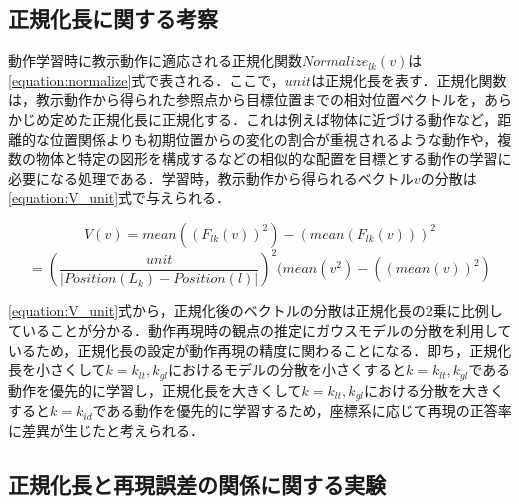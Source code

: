\subsection{正規化長に関する考察}
\label{subsection:UNIT}
動作学習時に教示動作に適応される正規化関数$Normalize_{lk}(v)$は\ref{equation:normalize}式で表される．ここで，$unit$は正規化長を表す．正規化関数は，教示動作から得られた参照点から目標位置までの相対位置ベクトルを，あらかじめ定めた正規化長に正規化する．これは例えば物体に近づける動作など，距離的な位置関係よりも初期位置からの変化の割合が重視されるような動作や，複数の物体と特定の図形を構成するなどの相似的な配置を目標とする動作の学習に必要になる処理である．学習時，教示動作から得られるベクトル$v$の分散は\ref{equation:V_unit}式で与えられる．

\[
	V(v) = mean((F_{lk}(v))^{2}) - (mean(F_{lk}(v)))^{2}
\]
\begin{equation}
	\label{equation:V_unit}
	 = \left(\frac{unit}{| Position(L_{k})-Position(l) |}\right)^{2}(mean(v^{2}) - ((mean(v))^{2})
\end{equation}

\ref{equation:V_unit}式から，正規化後のベクトルの分散は正規化長の2乗に比例していることが分かる．動作再現時の観点の推定にガウスモデルの分散を利用しているため，正規化長の設定が動作再現の精度に関わることになる．即ち，正規化長を小さくして$k=k_{lt} , k_{gl}$におけるモデルの分散を小さくすると$k=k_{lt} , k_{gl}$である動作を優先的に学習し，正規化長を大きくして$k=k_{lt} , k_{gl}$における分散を大きくすると$k=k_{id}$である動作を優先的に学習するため，座標系に応じて再現の正答率に差異が生じたと考えられる．

\subsection{正規化長と再現誤差の関係に関する実験}

